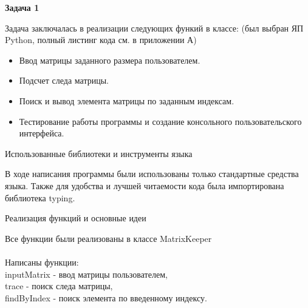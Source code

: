 \begin{Large} 
	\textbf{Задача 1}\\
	
	 \end{Large} 
Задача заключалась в реализации следующих функий в классе: (был выбран ЯП Python, полный листинг кода см. в приложении А)
\begin{itemize}
	\item Ввод матрицы заданного размера пользователем.
	\item Подсчет следа матрицы.
	\item Поиск и вывод элемента матрицы по заданным индексам.
	\item Тестирование работы программы и создание консольного пользовательского интерфейса.\\
\end{itemize}

\begin{large}
	Использованные библиотеки и инструменты языка\\
\end{large}
В ходе написания программы были использованы только стандартные средства языка. Также для удобства и лучшей читаемости кода была импортирована библиотека typing.\\

\begin{large}
	Реализация функций и основные идеи\\
\end{large}
Все функции были реализованы в классе MatrixKeeper\\\\
Написаны функции:\\
inputMatrix - ввод матрицы пользователем,\\
trace - поиск следа матрицы,\\
findByIndex - поиск элемента по введенному индексу.\\


